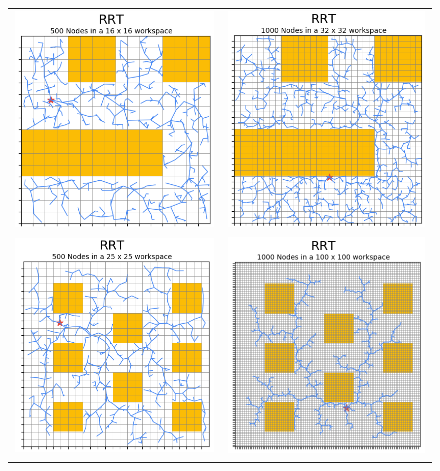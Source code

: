

\begin{figure}[H]
\begin{center}
\begin{tabular}{c  c}
    \includegraphics[draft=false,width=0.45\linewidth]{chapters/chapter2/img/rrt_2d_1.png} & \includegraphics[draft=false,width=0.45\linewidth]{chapters/chapter2/img/rrt_2d_2.png} \\
    \includegraphics[draft=false,width=0.45\linewidth]{chapters/chapter2/img/rrt_2d_3.png} & \includegraphics[draft=false,width=0.45\linewidth]{chapters/chapter2/img/rrt_2d_4.png}

\end{tabular}
\end{center}
\end{figure}

